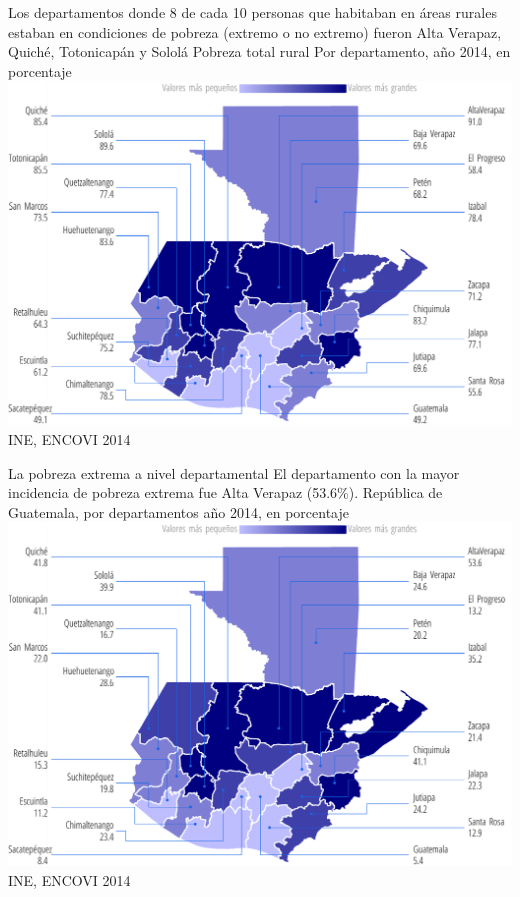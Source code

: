                     {%
                    Los departamentos donde 8 de cada 10 personas que habitaban en áreas rurales estaban en condiciones de pobreza (extremo o no extremo) fueron Alta Verapaz, Quiché, Totonicapán y Sololá}%
                    {%
                    	Pobreza total rural
                    } %
                    {%
                    Por departamento, año 2014, en porcentaje} %
                    {%
                    	\includegraphics[width=52\cuadri]{graficas/1_17.pdf}}%
                    {%
                    	INE, ENCOVI 2014} %
                    
                    {%
                   La pobreza extrema a nivel departamental  }%
                    {%
                    El departamento con la mayor incidencia de pobreza extrema fue Alta Verapaz (53.6\%).
                    } %
                    {%
                    	República de Guatemala, por departamentos año 2014, en porcentaje} %
                    {%
                    	\includegraphics[width=52\cuadri]{graficas/1_18.pdf}}%
                    {%
                    	INE, ENCOVI 2014} %
                    
